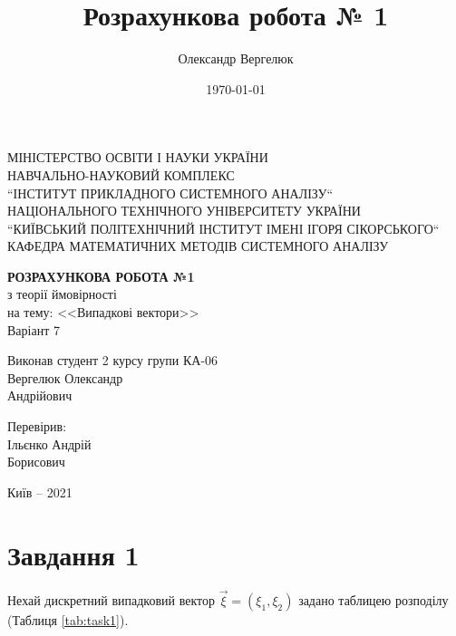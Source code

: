 \documentclass[14pt, a4paper, ukrainian]{extreport}
\title{Розрахункова робота № 1}
\author{Олександр Вергелюк}
\date{\today}
\begin{document}
	\begin{titlepage}
	\centering
	\vspace{1cm}
	{ МІНІСТЕРСТВО ОСВІТИ І НАУКИ УКРАЇНИ\\
		НАВЧАЛЬНО-НАУКОВИЙ КОМПЛЕКС\\
		``ІНСТИТУТ ПРИКЛАДНОГО СИСТЕМНОГО АНАЛІЗУ``\\
		НАЦІОНАЛЬНОГО ТЕХНІЧНОГО УНІВЕРСИТЕТУ УКРАЇНИ\\
		``КИЇВСЬКИЙ ПОЛІТЕХНІЧНИЙ ІНСТИТУТ ІМЕНІ ІГОРЯ СІКОРСЬКОГО``\\
		КАФЕДРА МАТЕМАТИЧНИХ МЕТОДІВ  СИСТЕМНОГО АНАЛІЗУ\\\par}
	\vspace{5cm}
\Large \MakeUppercase {\textsc{\textbf{{розрахункова робота №1}}}}\\
\Large {з теорії ймовірності} \\
на тему: {<<Випадкові вектори>>}\\
Варіант 7
\vfill
\newlength{\ML}
\settowidth{\ML}{\hspace{3.4cm}}
\hfill
\begin{minipage}{0.48\textwidth}
	Виконав студент 2 курсу групи КА-06\\
	Вергелюк Олександр\\ Андрійович
	
	Перевірив: \\
	Ільєнко Андрій\\ Борисович
\end{minipage}
\vfill
\begin{center}
Київ -- 2021
\end{center}
\end{titlepage}
	\setcounter{page}{2}
	\renewcommand\contentsname{Зміст}
	\tableofcontents
	\chapter{Завдання 1}

	Нехай дискретний випадковий вектор $\vec\xi = (\xi_1, \xi_2)$ задано таблицею розподілу (Таблиця {\ref {tab:task1}}).
	
	\begin{table}[H]
		\caption {\label{tab:task1} Таблиця розподілу вектора $\vec \xi$}
		
		\begin{center}
		\end{center}
	\end{table}
	
\end{document}
